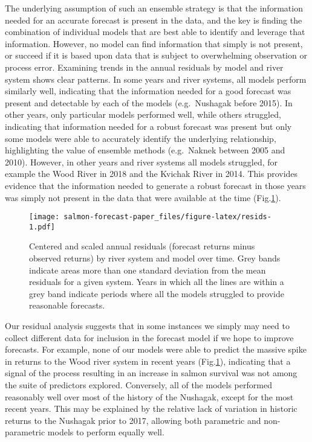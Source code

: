 \documentclass[
]{article}
\begin{document}
The underlying assumption of such an ensemble strategy is that the information needed for an accurate forecast is present in the data, and the key is finding the combination of individual models that are best able to identify and leverage that information. However, no model can find information that simply is not present, or succeed if it is based upon data that is subject to overwhelming observation or process error. Examining trends in the annual residuals by model and river system shows clear patterns. In some years and river systems, all models perform similarly well, indicating that the information needed for a good forecast was present and detectable by each of the models (e.g.~Nushagak before 2015). In other years, only particular models performed well, while others struggled, indicating that information needed for a robust forecast was present but only some models were able to accurately identify the underlying relationship, highlighting the value of ensemble methods (e.g.~Naknek between 2005 and 2010). However, in other years and river systems all models struggled, for example the Wood River in 2018 and the Kvichak River in 2014. This provides evidence that the information needed to generate a robust forecast in those years was simply not present in the data that were available at the time (Fig.\ref{fig:resids}).

\begin{figure}
\centering
\texttt{[image: salmon-forecast-paper\_files/figure-latex/resids-1.pdf]}
\caption{\label{fig:resids}Centered and scaled annual residuals (forecast returns minus observed returns) by river system and model over time. Grey bands indicate areas more than one standard deviation from the mean residuals for a given system. Years in which all the lines are within a grey band indicate periods where all the models struggled to provide reasonable forecasts.}
\end{figure}

Our residual analysis suggests that in some instances we simply may need to collect different data for inclusion in the forecast model if we hope to improve forecasts. For example, none of our models were able to predict the massive spike in returns to the Wood river system in recent years (Fig.\ref{fig:resids}), indicating that a signal of the process resulting in an increase in salmon survival was not among the suite of predictors explored. Conversely, all of the models performed reasonably well over most of the history of the Nushagak, except for the most recent years. This may be explained by the relative lack of variation in historic returns to the Nushagak prior to 2017, allowing both parametric and non-parametric models to perform equally well.
\end{document}
